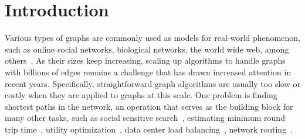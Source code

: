 \section{Introduction}
\label{introduction}

Various types of graphs are commonly used as models for real-world phenomenon, such as online social networks, biological networks, the world wide web, among others~\cite{newman2010networks}. As their sizes keep increasing, scaling up algorithms to handle graphs with billions of edges remains a challenge that has drawn increased attention in recent years. Specifically, straightforward graph algorithms are usually too slow or costly when they are applied to graphs at this scale. One problem is finding shortest paths in the network, an operation that serves as the building block for many other tasks, such as social sensitive search~\cite{Vieira:2007:ESR:1321440.1321520}, estimating minimum round trip time~\cite{Tang:2003:VLI:948205.948223}, utility optimization~\cite{wang2003can}, data center load balancing~\cite{7524468}, network routing~\cite{6566857}. 

